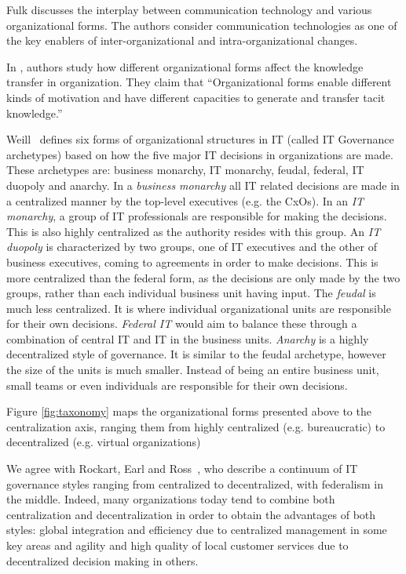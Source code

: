 Fulk \cite{fulk1995} discusses the interplay between communication technology and various organizational forms. The authors consider communication technologies as one of the key enablers of inter-organizational and intra-organizational changes.

In \cite{osterloh2000}, authors study how different organizational forms affect the knowledge transfer in organization. They claim that ``Organizational forms enable different kinds of motivation and have different capacities to generate and transfer tacit knowledge.''

Weill~\cite{Weill2004} defines six forms of organizational structures in IT (called IT Governance archetypes) based on how the five major IT decisions in organizations are made. These archetypes are: business monarchy, IT monarchy, feudal, federal, IT duopoly and anarchy.   In a \textit{business monarchy} all IT related decisions are made in a centralized manner by the top-level executives (e.g. the CxOs). In an \textit{IT monarchy}, a group of IT professionals are responsible for making the decisions. This is also highly centralized as the authority resides with this group. An \textit{IT duopoly} is characterized by two groups, one of IT executives and the other of business executives, coming to agreements in order to make decisions. This is more centralized than the federal form, as the decisions are only made by the two groups, rather than each individual business unit having input. The \textit{feudal} is much less centralized. It is where individual organizational units are responsible for their own decisions. \textit{Federal IT  }would aim to balance these through a combination of central IT and IT in the business units. \textit{Anarchy} is a highly decentralized style of governance. It is similar to the feudal archetype, however the size of the units is much smaller. Instead of being an entire business unit, small teams or even individuals are responsible for their own decisions.

Figure \ref{fig:taxonomy} maps the organizational forms presented above to the centralization axis, ranging them from highly centralized (e.g. bureaucratic) to decentralized (e.g. virtual organizations)

We agree with Rockart, Earl and Ross~\cite{Rockart1996}, who describe a continuum of IT governance styles ranging from centralized to decentralized, with federalism in the middle. Indeed, many organizations today tend to combine both centralization and decentralization in order to obtain the advantages of both styles: global integration and efficiency due to centralized management in some key areas and agility and high quality of local customer services due to decentralized decision making in others. 

